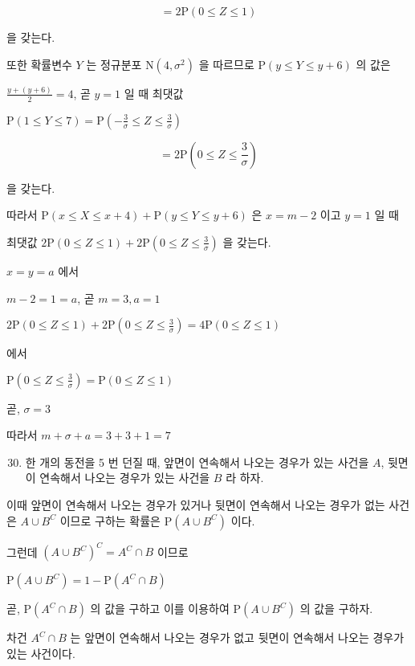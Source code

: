 \documentclass[10pt]{article}
\begin{document}
\[
=2 \mathrm{P}(0 \leq Z \leq 1)
\]

을 갖는다.

또한 확률변수 \(Y\) 는 정규분포 \(\mathrm{N}\left(4, \sigma^{2}\right)\) 을 따르므로 \(\mathrm{P}(y \leq Y \leq y+6)\) 의 값은

\(\frac{y+(y+6)}{2}=4\), 곧 \(y=1\) 일 때 최댓값

\(\mathrm{P}(1 \leq Y \leq 7)=\mathrm{P}\left(-\frac{3}{\sigma} \leq Z \leq \frac{3}{\sigma}\right)\)

\[
=2 \mathrm{P}\left(0 \leq Z \leq \frac{3}{\sigma}\right)
\]

을 갖는다.

따라서 \(\mathrm{P}(x \leq X \leq x+4)+\mathrm{P}(y \leq Y \leq y+6)\) 은 \(x=m-2\) 이고 \(y=1\) 일 때

최댓값 \(2 \mathrm{P}(0 \leq Z \leq 1)+2 \mathrm{P}\left(0 \leq Z \leq \frac{3}{\sigma}\right)\) 을 갖는다.

\(x=y=a\) 에서

\(m-2=1=a\), 곧 \(m=3, a=1\)

\(2 \mathrm{P}(0 \leq Z \leq 1)+2 \mathrm{P}\left(0 \leq Z \leq \frac{3}{\sigma}\right)=4 \mathrm{P}(0 \leq Z \leq 1)\)

에서

\(\mathrm{P}\left(0 \leq Z \leq \frac{3}{\sigma}\right)=\mathrm{P}(0 \leq Z \leq 1)\)

곧, \(\sigma=3\)

따라서 \(m+\sigma+a=3+3+1=7\)

\begin{enumerate}
  \setcounter{enumi}{29}
  \item 한 개의 동전을 5 번 던질 때, 앞면이 연속해서 나오는 경우가 있는 사건을 \(A\), 뒷면이 연속해서 나오는 경우가 있는 사건을 \(B\) 라 하자.
\end{enumerate}

이때 앞면이 연속해서 나오는 경우가 있거나 뒷면이 연속해서 나오는 경우가 없는 사건은 \(A \cup B^{C}\) 이므로 구하는 확률은 \(\mathrm{P}\left(A \cup B^{C}\right)\) 이다.

그런데 \(\left(A \cup B^{C}\right)^{C}=A^{C} \cap B\) 이므로

\(\mathrm{P}\left(A \cup B^{C}\right)=1-\mathrm{P}\left(A^{C} \cap B\right)\)

곧, \(\mathrm{P}\left(A^{C} \cap B\right)\) 의 값을 구하고 이를 이용하여 \(\mathrm{P}\left(A \cup B^{C}\right)\) 의 값을 구하자.

차건 \(A^{C} \cap B\) 는 앞면이 연속해서 나오는 경우가 없고 뒷면이 연속해서 나오는 경우가 있는 사건이다.
\end{document}
